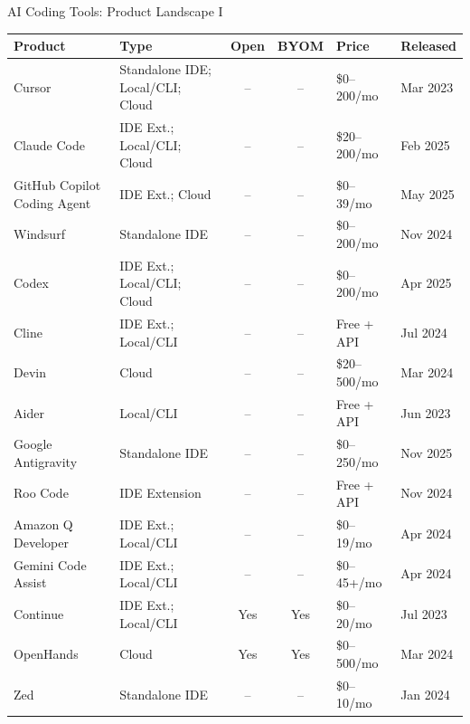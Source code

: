 \begin{frame}{AI Coding Tools: Product Landscape I}
\centering
\scriptsize
\begin{tabular}{p{2.6cm} p{2.7cm} c c p{1.7cm} p{1.4cm}}
\toprule
\textbf{Product} & \textbf{Type} & \textbf{Open} & \textbf{BYOM} & \textbf{Price} & \textbf{Released} \\
\midrule
Cursor & Standalone IDE; Local/CLI; Cloud & -- & -- & \$0--200/mo & Mar 2023 \\
Claude Code & IDE Ext.; Local/CLI; Cloud & -- & -- & \$20--200/mo & Feb 2025 \\
GitHub Copilot Coding Agent & IDE Ext.; Cloud & -- & -- & \$0--39/mo & May 2025 \\
Windsurf & Standalone IDE & -- & -- & \$0--200/mo & Nov 2024 \\
Codex & IDE Ext.; Local/CLI; Cloud & -- & -- & \$0--200/mo & Apr 2025 \\
Cline & IDE Ext.; Local/CLI & -- & -- & Free + API & Jul 2024 \\
Devin & Cloud & -- & -- & \$20--500/mo & Mar 2024 \\
Aider & Local/CLI & -- & -- & Free + API & Jun 2023 \\
Google Antigravity & Standalone IDE & -- & -- & \$0--250/mo & Nov 2025 \\
Roo Code & IDE Extension & -- & -- & Free + API & Nov 2024 \\
Amazon Q Developer & IDE Ext.; Local/CLI & -- & -- & \$0--19/mo & Apr 2024 \\
Gemini Code Assist & IDE Ext.; Local/CLI & -- & -- & \$0--45+/mo & Apr 2024 \\
Continue & IDE Ext.; Local/CLI & Yes & Yes & \$0--20/mo & Jul 2023 \\
OpenHands & Cloud & Yes & Yes & \$0--500/mo & Mar 2024 \\
Zed & Standalone IDE & -- & -- & \$0--10/mo & Jan 2024 \\
\bottomrule
\end{tabular}
\end{frame}

